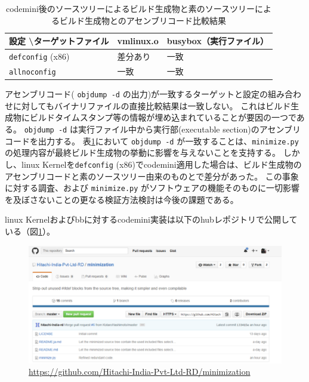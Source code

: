 \begin{table}[H]
  \caption{\acrshort{codemini}後のソースツリーによるビルド生成物と素のソースツリーによるビルド生成物とのアセンブリコード比較結果}
  \label{assemblycomp}
  \centering
  \begin{tabular}{l|ll}
    設定 \textbackslash ターゲットファイル & vmlinux.o & busybox（実行ファイル） \\
    \hline 
    \verb|defconfig| (x86) & 差分あり & 一致 \\
    \verb|allnoconfig| & 一致 & 一致
  \end{tabular}
\end{table}
\par
アセンブリコード( \verb|objdump -d| の出力)が一致するターゲットと設定の組み合わせに対してもバイナリファイルの直接比較結果は一致しない。
これはビルド生成物にビルドタイムスタンプ等の情報が埋め込まれていることが要因の一つである。
\verb|objdump -d| は実行ファイル中から実行部(executable section)のアセンブリコードを出力する。
表\ref{assemblycomp}において \verb|objdump -d| が一致することは、\verb|minimize.py| の処理内容が最終ビルド生成物の挙動に影響を与えないことを支持する。
しかし、\acrshort{linux} Kernelを\verb|defconfig| (x86)で\acrshort{codemini}適用した場合は、ビルド生成物のアセンブリコードと素のソースツリー由来のものとで差分があった。
この事象に対する調査、および \verb|minimize.py| がソフトウェアの機能そのものに一切影響を及ぼさないことの更なる検証方法検討は今後の課題である。
\par
\acrshort{linux} Kernelおよび\acrshort{bb}に対する\acrshort{codemini}実装は以下の\acrshort{hub}レポジトリで公開している（図\ref{minigithub}）。\cite{minimization}
\begin{figure}[H]
  \centering
  \includegraphics[width=\textwidth]{pic/minigithub.eps}
  \caption{\href{https://github.com/Hitachi-India-Pvt-Ltd-RD/minimization}{https://github.com/Hitachi-India-Pvt-Ltd-RD/minimization}}
  \label{minigithub}
\end{figure}
